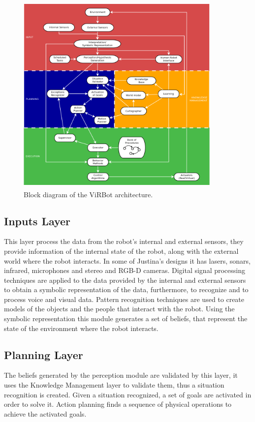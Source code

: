 \documentclass{llncs}
\begin{document}
\begin{figure}[h]
	\centering
	\includegraphics[angle=0, height=10cm, width=10cm]{Figures/ViRBot.png}
	\caption{Block diagram of the ViRBot architecture.}
	\label{fig:virbot}
\end{figure}


\subsection{Inputs Layer}

This layer process the data from the robot's internal and external sensors, they provide information of the internal state of the robot, along with the external world where the robot interacts.
In some of Justina's designs it has lasers, sonars, infrared, microphones and stereo and RGB-D cameras.
Digital signal processing techniques are applied to the data provided by the internal and external sensors to obtain a symbolic representation of the data, furthermore, to recognize and to process voice and visual data.
Pattern recognition techniques are used to create models of the objects and the people that interact with the robot.
Using the symbolic representation this module generates a set of beliefs, that represent the state of the environment where the robot interacts.


\subsection{Planning Layer}

The beliefs generated by the perception module are validated by this layer, it uses the Knowledge Management layer to validate them, thus a situation recognition is created. 
Given a situation recognized, a set of goals are activated in order to solve it.
Action planning finds a sequence of physical operations to achieve the activated goals.
\end{document}
